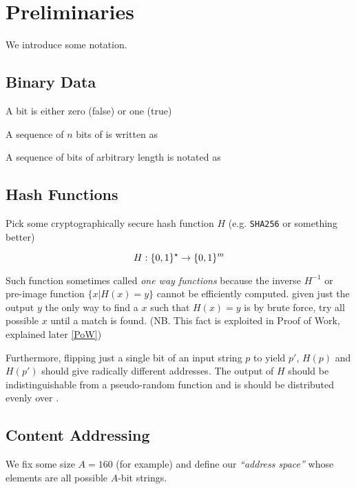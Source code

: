 \section{Preliminaries}

We introduce some notation.

\subsection{Binary Data}

A bit is either zero (false) or one (true)


A sequence of $n$ bits of is written as


A sequence of bits of arbitrary length is notated as


\subsection{Hash Functions}

Pick some cryptographically secure hash function $H$ (e.g. \texttt{SHA256} or something better)

\[
	H :   \{0,1\} ^{\star}  \to   \{0,1\} ^{m} 
\]

Such function sometimes called \emph{one way functions} because the inverse $H^{-1}$ or pre-image function $\{x | H(x) = y \}$ cannot be efficiently computed. given just the output $y$ the only way to find a $x$ such that $H(x)=y$ is by brute force, try all possible $x$ until a match is found. (NB. This fact is exploited in Proof of Work, explained later \ref{PoW})

Furthermore, flipping just a single bit of an input string $p$ to yield $p'$, $H(p)$ and $H(p')$ should give radically different addresses. The output of $H$ should be indistinguishable from  a pseudo-random function and is should be distributed evenly over .

\subsection{Content Addressing}

We fix some size $A=160$ (for example) and define our \emph{``address space''} whose elements are all possible $A$-bit strings.


